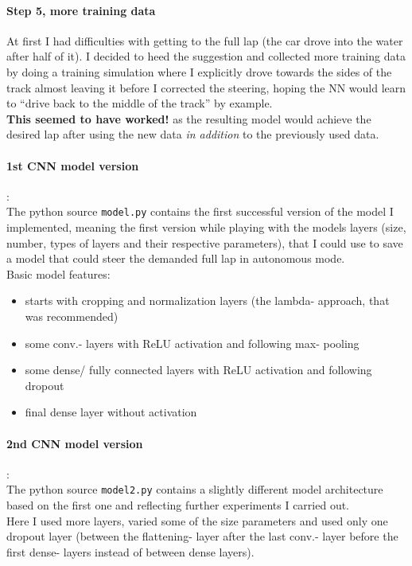 \documentclass[a4paper]{article}
\begin{document}
\paragraph{Step 5, more training data}
At first I had difficulties with getting to the full lap (the car drove
into the water after half of it). I decided to heed the suggestion and collected
more training data by doing a training simulation where I explicitly drove towards
the sides of the track almost leaving it before I corrected the steering,
hoping the NN would learn to \enquote{drive back to the middle of the track}
by example.\\
\textbf{This seemed to have worked!} as the resulting model would achieve
the desired lap after using the new data \textit{in addition} to the previously used data.

\paragraph{1st CNN model version}
:\\
The python source \texttt{model.py} contains the first successful version of
the model I implemented, meaning the first version while playing with the
models layers (size, number, types of layers and their respective parameters),
that I could use to save a model that could steer the demanded full lap in
autonomous mode.
\\

Basic model features:
\begin{itemize}
\item starts with cropping and normalization layers (the lambda- approach, that was recommended)
\item some conv.- layers with ReLU activation and following max- pooling
\item some dense/ fully connected layers with ReLU activation and following dropout
\item final dense layer without activation
\end{itemize}

\paragraph{2nd CNN model version}
:\\
The python source \texttt{model2.py} contains a slightly different model architecture
based on the first one and reflecting further experiments I carried out.\\
Here I used more layers, varied some of the size parameters and used only one dropout layer
(between the flattening- layer after the last conv.- layer before the first dense- layers
instead of between dense layers).
\end{document}
